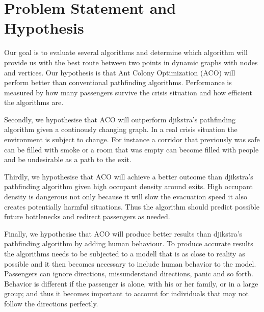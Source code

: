 \chapter{Problem Statement and Hypothesis}
\label{ch:problem}


Our goal is to evaluate several algorithms and determine which algorithm will provide us with the
best route between two points in dynamic graphs with nodes and vertices. Our hypothesis
is that Ant Colony Optimization (ACO) will perform better than conventional pathfinding
algorithms. Performance is measured by how many passengers survive the crisis situation
and how efficient the algorithms are. 

Secondly, we hypothesise that ACO will outperform djikstra's pathfinding algorithm
given a continously changing graph. In a real crisis situation the environment is subject
to change. For instance a corridor that previously was safe can be filled with smoke
or a room that was empty can become filled with people and be undesirable as a path
to the exit.

Thirdly, we hypothesise that ACO will achieve a better outcome than djikstra's pathfinding algorithm
given high occupant density around exits. High occupant density is dangerous not only
because it will slow the evacuation speed it also creates potentially harmful situations. Thus the algorithm
should predict possible future bottlenecks and redirect passengers as needed.

Finally, we hypothesise that ACO will produce better results than djikstra's pathfinding algorithm
by adding human behaviour. To produce accurate results the algorithms needs to be subjected
to a modell that is as close to reality as possible and it then becomes necessary to include
human behavior to the model. Passengers can ignore directions, missunderstand directions, panic
and so forth. Behavior is different if the passenger is alone, with his or her family, or in a large group;
and thus it becomes important to account for individuals that may not follow the directions perfectly.

